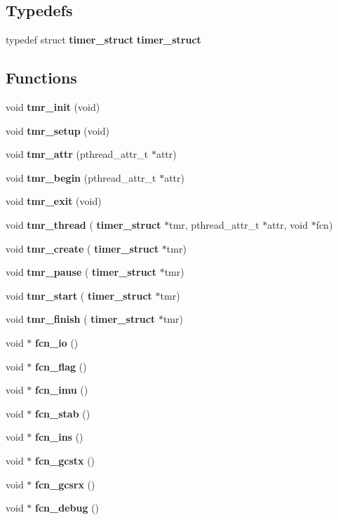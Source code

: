 \subsection*{Typedefs}
\begin{DoxyCompactItemize}
\item 
typedef struct \textbf{ timer\+\_\+struct} \textbf{ timer\+\_\+struct}
\end{DoxyCompactItemize}
\subsection*{Functions}
\begin{DoxyCompactItemize}
\item 
void \textbf{ tmr\+\_\+init} (void)
\item 
void \textbf{ tmr\+\_\+setup} (void)
\item 
void \textbf{ tmr\+\_\+attr} (pthread\+\_\+attr\+\_\+t $\ast$attr)
\item 
void \textbf{ tmr\+\_\+begin} (pthread\+\_\+attr\+\_\+t $\ast$attr)
\item 
void \textbf{ tmr\+\_\+exit} (void)
\item 
void \textbf{ tmr\+\_\+thread} (\textbf{ timer\+\_\+struct} $\ast$tmr, pthread\+\_\+attr\+\_\+t $\ast$attr, void $\ast$fcn)
\item 
void \textbf{ tmr\+\_\+create} (\textbf{ timer\+\_\+struct} $\ast$tmr)
\item 
void \textbf{ tmr\+\_\+pause} (\textbf{ timer\+\_\+struct} $\ast$tmr)
\item 
void \textbf{ tmr\+\_\+start} (\textbf{ timer\+\_\+struct} $\ast$tmr)
\item 
void \textbf{ tmr\+\_\+finish} (\textbf{ timer\+\_\+struct} $\ast$tmr)
\item 
void $\ast$ \textbf{ fcn\+\_\+io} ()
\item 
void $\ast$ \textbf{ fcn\+\_\+flag} ()
\item 
void $\ast$ \textbf{ fcn\+\_\+imu} ()
\item 
void $\ast$ \textbf{ fcn\+\_\+stab} ()
\item 
void $\ast$ \textbf{ fcn\+\_\+ins} ()
\item 
void $\ast$ \textbf{ fcn\+\_\+gcstx} ()
\item 
void $\ast$ \textbf{ fcn\+\_\+gcsrx} ()
\item 
void $\ast$ \textbf{ fcn\+\_\+debug} ()
\end{DoxyCompactItemize}
